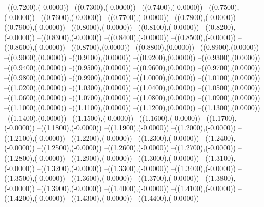 {	--({\sx*(0.7200)},{\sy*(-0.0000)})
	--({\sx*(0.7300)},{\sy*(-0.0000)})
	--({\sx*(0.7400)},{\sy*(-0.0000)})
	--({\sx*(0.7500)},{\sy*(-0.0000)})
	--({\sx*(0.7600)},{\sy*(-0.0000)})
	--({\sx*(0.7700)},{\sy*(-0.0000)})
	--({\sx*(0.7800)},{\sy*(-0.0000)})
	--({\sx*(0.7900)},{\sy*(-0.0000)})
	--({\sx*(0.8000)},{\sy*(-0.0000)})
	--({\sx*(0.8100)},{\sy*(-0.0000)})
	--({\sx*(0.8200)},{\sy*(-0.0000)})
	--({\sx*(0.8300)},{\sy*(-0.0000)})
	--({\sx*(0.8400)},{\sy*(-0.0000)})
	--({\sx*(0.8500)},{\sy*(-0.0000)})
	--({\sx*(0.8600)},{\sy*(-0.0000)})
	--({\sx*(0.8700)},{\sy*(0.0000)})
	--({\sx*(0.8800)},{\sy*(0.0000)})
	--({\sx*(0.8900)},{\sy*(0.0000)})
	--({\sx*(0.9000)},{\sy*(0.0000)})
	--({\sx*(0.9100)},{\sy*(0.0000)})
	--({\sx*(0.9200)},{\sy*(0.0000)})
	--({\sx*(0.9300)},{\sy*(0.0000)})
	--({\sx*(0.9400)},{\sy*(0.0000)})
	--({\sx*(0.9500)},{\sy*(0.0000)})
	--({\sx*(0.9600)},{\sy*(0.0000)})
	--({\sx*(0.9700)},{\sy*(0.0000)})
	--({\sx*(0.9800)},{\sy*(0.0000)})
	--({\sx*(0.9900)},{\sy*(0.0000)})
	--({\sx*(1.0000)},{\sy*(0.0000)})
	--({\sx*(1.0100)},{\sy*(0.0000)})
	--({\sx*(1.0200)},{\sy*(0.0000)})
	--({\sx*(1.0300)},{\sy*(0.0000)})
	--({\sx*(1.0400)},{\sy*(0.0000)})
	--({\sx*(1.0500)},{\sy*(0.0000)})
	--({\sx*(1.0600)},{\sy*(0.0000)})
	--({\sx*(1.0700)},{\sy*(0.0000)})
	--({\sx*(1.0800)},{\sy*(0.0000)})
	--({\sx*(1.0900)},{\sy*(0.0000)})
	--({\sx*(1.1000)},{\sy*(0.0000)})
	--({\sx*(1.1100)},{\sy*(0.0000)})
	--({\sx*(1.1200)},{\sy*(0.0000)})
	--({\sx*(1.1300)},{\sy*(0.0000)})
	--({\sx*(1.1400)},{\sy*(0.0000)})
	--({\sx*(1.1500)},{\sy*(-0.0000)})
	--({\sx*(1.1600)},{\sy*(-0.0000)})
	--({\sx*(1.1700)},{\sy*(-0.0000)})
	--({\sx*(1.1800)},{\sy*(-0.0000)})
	--({\sx*(1.1900)},{\sy*(-0.0000)})
	--({\sx*(1.2000)},{\sy*(-0.0000)})
	--({\sx*(1.2100)},{\sy*(-0.0000)})
	--({\sx*(1.2200)},{\sy*(-0.0000)})
	--({\sx*(1.2300)},{\sy*(-0.0000)})
	--({\sx*(1.2400)},{\sy*(-0.0000)})
	--({\sx*(1.2500)},{\sy*(-0.0000)})
	--({\sx*(1.2600)},{\sy*(-0.0000)})
	--({\sx*(1.2700)},{\sy*(-0.0000)})
	--({\sx*(1.2800)},{\sy*(-0.0000)})
	--({\sx*(1.2900)},{\sy*(-0.0000)})
	--({\sx*(1.3000)},{\sy*(-0.0000)})
	--({\sx*(1.3100)},{\sy*(-0.0000)})
	--({\sx*(1.3200)},{\sy*(-0.0000)})
	--({\sx*(1.3300)},{\sy*(-0.0000)})
	--({\sx*(1.3400)},{\sy*(-0.0000)})
	--({\sx*(1.3500)},{\sy*(-0.0000)})
	--({\sx*(1.3600)},{\sy*(-0.0000)})
	--({\sx*(1.3700)},{\sy*(-0.0000)})
	--({\sx*(1.3800)},{\sy*(-0.0000)})
	--({\sx*(1.3900)},{\sy*(-0.0000)})
	--({\sx*(1.4000)},{\sy*(-0.0000)})
	--({\sx*(1.4100)},{\sy*(-0.0000)})
	--({\sx*(1.4200)},{\sy*(-0.0000)})
	--({\sx*(1.4300)},{\sy*(-0.0000)})
	--({\sx*(1.4400)},{\sy*(-0.0000)})
}
